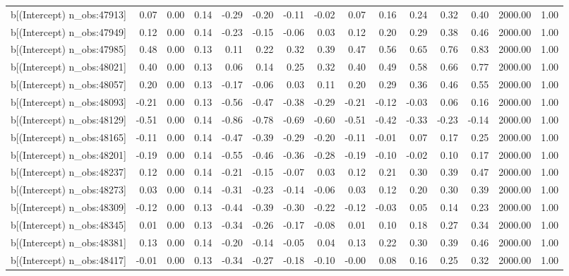 \begin{table}[ht]
\begin{tabular}{rrrrrrrrrrrrrrr}
  b[(Intercept) n\_obs:47913] & 0.07 & 0.00 & 0.14 & -0.29 & -0.20 & -0.11 & -0.02 & 0.07 & 0.16 & 0.24 & 0.32 & 0.40 & 2000.00 & 1.00 \\ 
  b[(Intercept) n\_obs:47949] & 0.12 & 0.00 & 0.14 & -0.23 & -0.15 & -0.06 & 0.03 & 0.12 & 0.20 & 0.29 & 0.38 & 0.46 & 2000.00 & 1.00 \\ 
  b[(Intercept) n\_obs:47985] & 0.48 & 0.00 & 0.13 & 0.11 & 0.22 & 0.32 & 0.39 & 0.47 & 0.56 & 0.65 & 0.76 & 0.83 & 2000.00 & 1.00 \\ 
  b[(Intercept) n\_obs:48021] & 0.40 & 0.00 & 0.13 & 0.06 & 0.14 & 0.25 & 0.32 & 0.40 & 0.49 & 0.58 & 0.66 & 0.77 & 2000.00 & 1.00 \\ 
  b[(Intercept) n\_obs:48057] & 0.20 & 0.00 & 0.13 & -0.17 & -0.06 & 0.03 & 0.11 & 0.20 & 0.29 & 0.36 & 0.46 & 0.55 & 2000.00 & 1.00 \\ 
  b[(Intercept) n\_obs:48093] & -0.21 & 0.00 & 0.13 & -0.56 & -0.47 & -0.38 & -0.29 & -0.21 & -0.12 & -0.03 & 0.06 & 0.16 & 2000.00 & 1.00 \\ 
  b[(Intercept) n\_obs:48129] & -0.51 & 0.00 & 0.14 & -0.86 & -0.78 & -0.69 & -0.60 & -0.51 & -0.42 & -0.33 & -0.23 & -0.14 & 2000.00 & 1.00 \\ 
  b[(Intercept) n\_obs:48165] & -0.11 & 0.00 & 0.14 & -0.47 & -0.39 & -0.29 & -0.20 & -0.11 & -0.01 & 0.07 & 0.17 & 0.25 & 2000.00 & 1.00 \\ 
  b[(Intercept) n\_obs:48201] & -0.19 & 0.00 & 0.14 & -0.55 & -0.46 & -0.36 & -0.28 & -0.19 & -0.10 & -0.02 & 0.10 & 0.17 & 2000.00 & 1.00 \\ 
  b[(Intercept) n\_obs:48237] & 0.12 & 0.00 & 0.14 & -0.21 & -0.15 & -0.07 & 0.03 & 0.12 & 0.21 & 0.30 & 0.39 & 0.47 & 2000.00 & 1.00 \\ 
  b[(Intercept) n\_obs:48273] & 0.03 & 0.00 & 0.14 & -0.31 & -0.23 & -0.14 & -0.06 & 0.03 & 0.12 & 0.20 & 0.30 & 0.39 & 2000.00 & 1.00 \\ 
  b[(Intercept) n\_obs:48309] & -0.12 & 0.00 & 0.13 & -0.44 & -0.39 & -0.30 & -0.22 & -0.12 & -0.03 & 0.05 & 0.14 & 0.23 & 2000.00 & 1.00 \\ 
  b[(Intercept) n\_obs:48345] & 0.01 & 0.00 & 0.13 & -0.34 & -0.26 & -0.17 & -0.08 & 0.01 & 0.10 & 0.18 & 0.27 & 0.34 & 2000.00 & 1.00 \\ 
  b[(Intercept) n\_obs:48381] & 0.13 & 0.00 & 0.14 & -0.20 & -0.14 & -0.05 & 0.04 & 0.13 & 0.22 & 0.30 & 0.39 & 0.46 & 2000.00 & 1.00 \\ 
  b[(Intercept) n\_obs:48417] & -0.01 & 0.00 & 0.13 & -0.34 & -0.27 & -0.18 & -0.10 & -0.00 & 0.08 & 0.16 & 0.25 & 0.32 & 2000.00 & 1.00 \\ 

\end{tabular}
\end{table}
